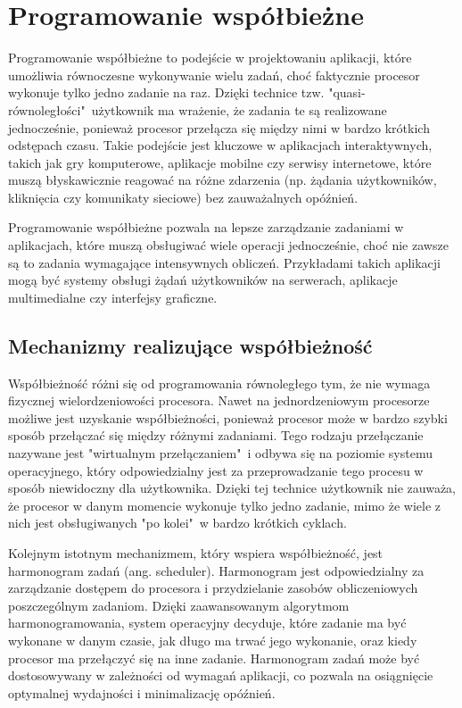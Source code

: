 \section{Programowanie współbieżne}

Programowanie współbieżne to podejście w projektowaniu aplikacji, które umożliwia równoczesne wykonywanie wielu zadań, choć faktycznie procesor wykonuje tylko jedno zadanie na raz. Dzięki technice tzw. "quasi-równoległości"\ użytkownik ma wrażenie, że zadania te są realizowane jednocześnie, ponieważ procesor przełącza się między nimi w bardzo krótkich odstępach czasu. Takie podejście jest kluczowe w aplikacjach interaktywnych, takich jak gry komputerowe, aplikacje mobilne czy serwisy internetowe, które muszą błyskawicznie reagować na różne zdarzenia (np. żądania użytkowników, kliknięcia czy komunikaty sieciowe) bez zauważalnych opóźnień.

Programowanie współbieżne pozwala na lepsze zarządzanie zadaniami w aplikacjach, które muszą obsługiwać wiele operacji jednocześnie, choć nie zawsze są to zadania wymagające intensywnych obliczeń. Przykładami takich aplikacji mogą być systemy obsługi żądań użytkowników na serwerach, aplikacje multimedialne czy interfejsy graficzne.

\subsection{Mechanizmy realizujące współbieżność}
Współbieżność różni się od programowania równoległego tym, że nie wymaga fizycznej wielordzeniowości procesora. Nawet na jednordzeniowym procesorze możliwe jest uzyskanie współbieżności, ponieważ procesor może w bardzo szybki sposób przełączać się między różnymi zadaniami. Tego rodzaju przełączanie nazywane jest "wirtualnym przełączaniem"\ i odbywa się na poziomie systemu operacyjnego, który odpowiedzialny jest za przeprowadzanie tego procesu w sposób niewidoczny dla użytkownika. Dzięki tej technice użytkownik nie zauważa, że procesor w danym momencie wykonuje tylko jedno zadanie, mimo że wiele z nich jest obsługiwanych "po kolei"\ w bardzo krótkich cyklach.

Kolejnym istotnym mechanizmem, który wspiera współbieżność, jest harmonogram zadań (ang. scheduler). Harmonogram jest odpowiedzialny za zarządzanie dostępem do procesora i przydzielanie zasobów obliczeniowych poszczególnym zadaniom. Dzięki zaawansowanym algorytmom harmonogramowania, system operacyjny decyduje, które zadanie ma być wykonane w danym czasie, jak długo ma trwać jego wykonanie, oraz kiedy procesor ma przełączyć się na inne zadanie. Harmonogram zadań może być dostosowywany w zależności od wymagań aplikacji, co pozwala na osiągnięcie optymalnej wydajności i minimalizację opóźnień.

